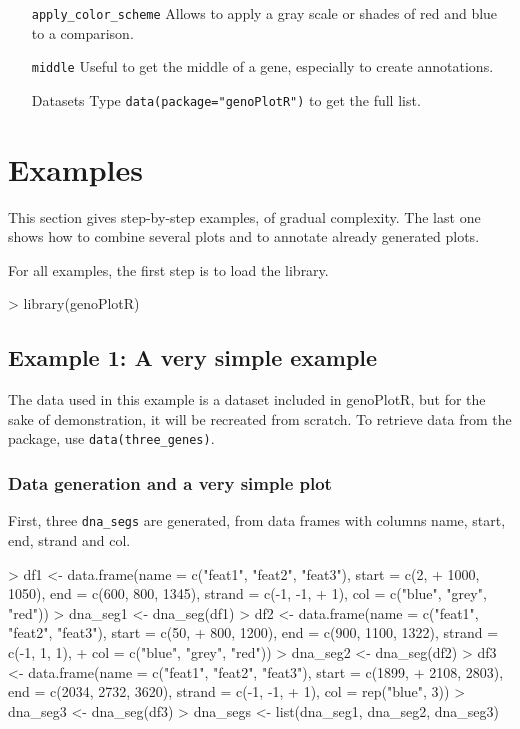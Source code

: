 \documentclass[a4paper]{article}
\newcommand{\code}[1]{\texttt{#1}}
\newcommand{\pkg}[1]{{\normalfont\fontseries{b}\selectfont #1}}
\newcommand{\genoPlotR}{\pkg{genoPlotR}}
\begin{document}
\begin{itemize}
  \item[\code{apply\_color\_scheme}] Allows to apply a gray scale or shades
    of red and blue to a comparison.
  \item[\code{middle}] Useful to get the middle of a gene, especially to
    create annotations.
  \item[Datasets] Type \code{data(package="genoPlotR")} to get the full list.
\end{itemize}

\section{Examples}

This section gives step-by-step examples, of gradual complexity. The last
one shows how to combine several plots and to annotate already generated 
plots.

For all examples, the first step is to load the library.

\begin{Schunk}
\begin{Sinput}
> library(genoPlotR)
\end{Sinput}
\end{Schunk}

\subsection{Example 1: A very simple example}

The data used in this example is a dataset included in \genoPlotR{}, but
for the sake of demonstration, it will be recreated from scratch. To retrieve
data from the package, use \code{data(three\_genes)}.

\subsubsection{Data generation and a very simple plot}

First, three \code{dna\_segs} are generated, from data frames with columns 
name, start, end, strand and col.

\begin{Schunk}
\begin{Sinput}
> df1 <- data.frame(name = c("feat1", "feat2", "feat3"), start = c(2, 
+     1000, 1050), end = c(600, 800, 1345), strand = c(-1, -1, 
+     1), col = c("blue", "grey", "red"))
> dna_seg1 <- dna_seg(df1)
> df2 <- data.frame(name = c("feat1", "feat2", "feat3"), start = c(50, 
+     800, 1200), end = c(900, 1100, 1322), strand = c(-1, 1, 1), 
+     col = c("blue", "grey", "red"))
> dna_seg2 <- dna_seg(df2)
> df3 <- data.frame(name = c("feat1", "feat2", "feat3"), start = c(1899, 
+     2108, 2803), end = c(2034, 2732, 3620), strand = c(-1, -1, 
+     1), col = rep("blue", 3))
> dna_seg3 <- dna_seg(df3)
> dna_segs <- list(dna_seg1, dna_seg2, dna_seg3)
\end{Sinput}
\end{Schunk}
\end{document}
